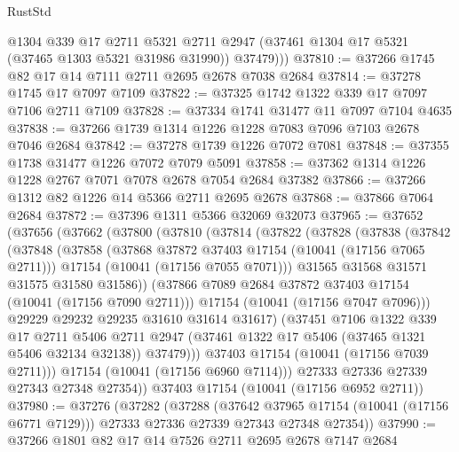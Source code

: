 \begin{lexlean}{RustStd}
\begin{coremodule}
          @1304
          @339
          @17
          @2711
          @5321
          @2711
          @2947
          (@37461 @1304 @17 @5321 (@37465 @1303 @5321 @31986 @31990))
          @37479)))
@37810 := @37266 @1745 @82 @17 @14 @7111 @2711 @2695 @2678 @7038 @2684
@37814 := @37278 @1745 @17 @7097 @7109
@37822 := @37325 @1742 @1322 @339 @17 @7097 @7106 @2711 @7109
@37828 := @37334 @1741 @31477 @11 @7097 @7104 @4635
@37838 := @37266 @1739 @1314 @1226 @1228 @7083 @7096 @7103 @2678 @7046 @2684
@37842 := @37278 @1739 @1226 @7072 @7081
@37848 := @37355 @1738 @31477 @1226 @7072 @7079 @5091
@37858 := @37362 @1314 @1226 @1228 @2767 @7071 @7078 @2678 @7054 @2684 @37382
@37866 := @37266 @1312 @82 @1226 @14 @5366 @2711 @2695 @2678
@37868 := @37866 @7064 @2684
@37872 := @37396 @1311 @5366 @32069 @32073
@37965 := @37652
    (@37656
      (@37662
        (@37800
          (@37810
            (@37814
              (@37822
                (@37828
                  (@37838
                    (@37842
                      (@37848
                        (@37858
                          (@37868 @37872 @37403 @17154 (@10041 (@17156 @7065 @2711)))
                          @17154
                          (@10041 (@17156 @7055 @7071)))
                        @31565
                        @31568
                        @31571
                        @31575
                        @31580
                        @31586))
                    (@37866 @7089 @2684 @37872 @37403 @17154 (@10041 (@17156 @7090 @2711)))
                    @17154
                    (@10041 (@17156 @7047 @7096)))
                  @29229
                  @29232
                  @29235
                  @31610
                  @31614
                  @31617)
                (@37451
                  @7106
                  @1322
                  @339
                  @17
                  @2711
                  @5406
                  @2711
                  @2947
                  (@37461 @1322 @17 @5406 (@37465 @1321 @5406 @32134 @32138))
                  @37479)))
            @37403
            @17154
            (@10041 (@17156 @7039 @2711)))
          @17154
          (@10041 (@17156 @6960 @7114)))
        @27333
        @27336
        @27339
        @27343
        @27348
        @27354))
    @37403
    @17154
    (@10041 (@17156 @6952 @2711))
@37980 := @37276
    (@37282
      (@37288
        (@37642 @37965 @17154 (@10041 (@17156 @6771 @7129)))
        @27333
        @27336
        @27339
        @27343
        @27348
        @27354))
@37990 := @37266 @1801 @82 @17 @14 @7526 @2711 @2695 @2678 @7147 @2684

\end{coremodule}
\end{lexlean}
